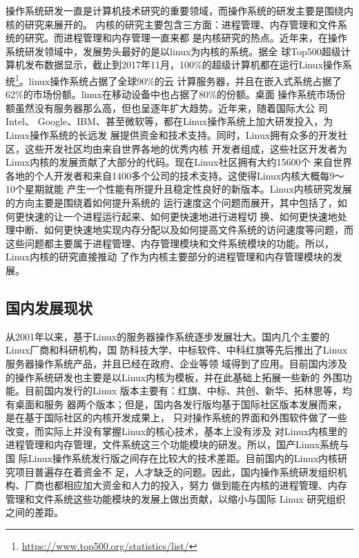 \documentclass{swfuthesism}
\begin{document}
操作系统研发一直是计算机技术研究的重要领域，而操作系统的研发主要是围绕内核的研究来展开的。
内核的研究主要包含三方面：进程管理、内存管理和文件系统的研究。而进程管理和内存管理一直来都
是内核研究的热点。近年来，在操作系统研发领域中，发展势头最好的是以linux为内核的系统。据全
球Top500超级计算机发布数据显示，截止到2017年11月，100\%的超级计算机都在运行Linux操作系
统\footnote{\url{https://www.top500.org/statistics/list/}}。linux操作系统占据了全球90\%的云
计算服务器，并且在嵌入式系统占据了62\%的市场份额。linux在移动设备中也占据了80\%的份额。桌面
操作系统市场份额虽然没有服务器那么高，但也呈逐年扩大趋势。近年来，随着国际大公
司Intel、 Google、IBM、甚至微软等，都在Linux操作系统上加大研发投入，为Linux操作系统的长远发
展提供资金和技术支持。同时，Linux拥有众多的开发社区，这些开发社区均由来自世界各地的优秀内核
开发者组成，这些社区开发者为Linux内核的发展贡献了大部分的代码。现在Linux社区拥有大约15600个
来自世界各地的个人开发者和来自1400多个公司的技术支持。这使得Linux内核大概每9～10个星期就能
产生一个性能有所提升且稳定性良好的新版本。Linux内核研究发展的方向主要是围绕着如何提升系统的
运行速度这个问题而展开，其中包括了，如何更快速的让一个进程运行起来、如何更快速地进行进程切
换、如何更快速地处理中断、如何更快速地实现内存分配以及如何提高文件系统的访问速度等问题，而
这些问题都主要属于进程管理、内存管理模块和文件系统模块的功能。所以，Linux内核的研究直接推动
了作为内核主要部分的进程管理和内存管理模块的发展。

\subsection{国内发展现状}

从2001年以来，基于Linux的服务器操作系统逐步发展壮大。国内几个主要的Linux厂商和科研机构，国
防科技大学、中标软件、中科红旗等先后推出了Linux服务器操作系统产品，并且已经在政府、企业等领
域得到了应用。目前国内涉及的操作系统研发也主要是以Linux内核为模板，并在此基础上拓展一些新的
外围功能。目前国内发行的Linux 版本主要有：红旗、中标、共创、新华、拓林思等，均有桌面和服务
器两个版本；但是，国内各发行版均基于国际社区版本发展而来，是在基于国际社区的内核开发成果上，
只对操作系统的界面和外围软件做了一些改变，而实际上并没有掌握Linux的核心技术，基本上没有涉及
对Linux内核里的进程管理和内存管理，文件系统这三个功能模块的研发。所以，国产Linux系统与国
际Linux操作系统发行版之间存在比较大的技术差距。目前国内的Linux内核研究项目普遍存在着资金不
足，人才缺乏的问题。因此，国内操作系统研发组织机构、厂商也都相应加大资金和人力的投入，努力
做到能在内核的进程管理、内存管理和文件系统这些功能模块的发展上做出贡献，以缩小与国际 Linux
研究组织之间的差距。
\end{document}
